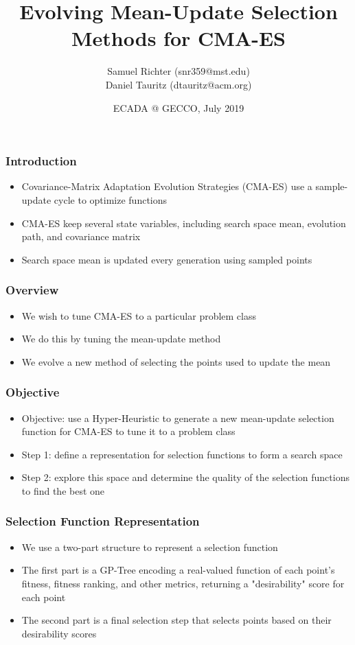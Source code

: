 \documentclass{beamer}
\title[Evolving Mean-Update Selection Methods for CMA-ES]
{Evolving Mean-Update Selection Methods for CMA-ES}
\author[Richter, Samuel \& Tauritz, Daniel] %
{Samuel Richter (snr359@mst.edu) \\Daniel Tauritz (dtauritz@acm.org)}
\institute %
{
  Natural Computation Laboratory\\
  Department of Computer Science\\
  Missouri University of Science and Technology\\
  Rolla, Missouri 65409
}
\date{ECADA @ GECCO, July 2019}
\begin{document}
 
	\frame{\titlepage}
	
	\begin{frame}
		\frametitle{Introduction}
		
		\begin{itemize}
			 \item<1-|alert@1> Covariance-Matrix Adaptation Evolution Strategies (CMA-ES) use a sample-update cycle to optimize functions
			 \item<2-|alert@2> CMA-ES keep several state variables, including search space mean, evolution path, and covariance matrix
			 \item<3-|alert@3> Search space mean is updated every generation using sampled points
		\end{itemize}
	\end{frame}

	\begin{frame}
		\frametitle{Overview}

		\begin{itemize}
			\item<1-|alert@1> We wish to tune CMA-ES to a particular problem class
			\item<2-|alert@2> We do this by tuning the mean-update method
			\item<3-|alert@3> We evolve a new method of selecting the points used to update the mean
		\end{itemize}
	\end{frame}
	
	\begin{frame}
		\frametitle{Objective}
		\begin{itemize}
			 \item<1-> Objective: use a Hyper-Heuristic to generate a new mean-update selection function for CMA-ES to tune it to a problem class
			 \item<2-|alert@2> Step 1: define a representation for selection functions to form a search space
			 \item<3-|alert@3> Step 2: explore this space and determine the quality of the selection functions to find the best one
		\end{itemize}	
	\end{frame}	
			
	\begin{frame}
		\frametitle{Selection Function Representation}
		
		\begin{itemize}
			 \item<1-|alert@1> We use a two-part structure to represent a selection function
			 \item<2-|alert@2> The first part is a GP-Tree encoding a real-valued function of each point's fitness, fitness ranking, and other metrics, returning a "desirability" score for each point
			 \item<3-|alert@3> The second part is a final selection step that selects points based on their desirability scores
			 
		
		\end{itemize}
	\end{frame}
	
\end{document}
